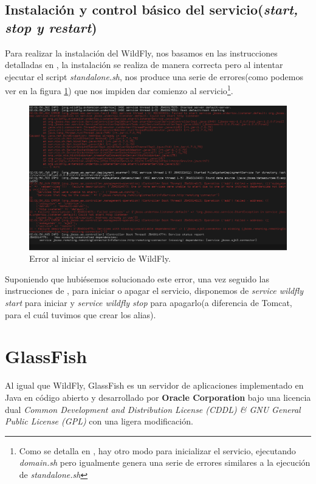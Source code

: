 \documentclass[a4paper, 10pt]{article}
\begin{document}
	\subsection{Instalación y control básico del servicio(\textit{start, stop y restart})}
		Para realizar la instalación del WildFly, nos basamos en las instrucciones detalladas
		en \cite{WF_install}, la instalación se realiza de manera correcta pero al intentar
		ejecutar el script \textit{standalone.sh}, nos produce una serie de errores(como
		podemos ver en la figura \ref{fig:WF_Fail}) que nos impiden dar comienzo al
		servicio\footnote{Como se detalla en \cite{WF_install}, hay otro modo para inicializar
		el servicio, ejecutando \textit{domain.sh} pero igualmente genera una serie de errores
		similares a la ejecución de \textit{standalone.sh}}.

		\begin{figure}[h!]
			\includegraphics[width=15cm]{Fail_WF.png}
			\caption{Error al iniciar el servicio de WildFly.}
			\label{fig:WF_Fail}
		\end{figure}

		Suponiendo que hubiésemos solucionado este error, una vez seguido las instrucciones de
		\cite{WF_install}, para iniciar o apagar el servicio, disponemos de \textit{service
		wildfly start} para iniciar y \textit{service wildfly stop} para apagarlo(a diferencia
		de Tomcat, para el cuál tuvimos que crear los alias).

\section{GlassFish}

	Al igual que WildFly, GlassFish es un servidor de aplicaciones implementado en Java en código
	abierto y desarrollado por \textbf{Oracle Corporation} bajo una licencia dual \textit{Common
	Development and Distribution License (CDDL) \& GNU General Public License (GPL)} con una ligera
	modificación.\cite{GF_official}\cite{GF_install}
	
\end{document}
